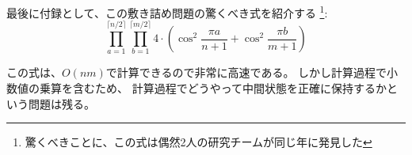 最後に付録として、この敷き詰め問題の驚くべき式を紹介する
\footnote{驚くべきことに、この式は偶然2人の研究チームが同じ年に発見した\cite{kas61,tem61}}:
\[ \prod_{a=1}^{\lceil n/2 \rceil} \prod_{b=1}^{\lceil m/2 \rceil} 4 \cdot (\cos^2 \frac{\pi a}{n + 1} + \cos^2 \frac{\pi b}{m+1})\]

この式は、$O(nm)$で計算できるので非常に高速である。
しかし計算過程で小数値の乗算を含むため、
計算過程でどうやって中間状態を正確に保持するかという問題は残る。
